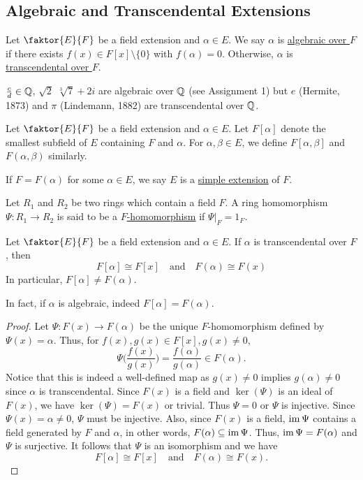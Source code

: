 \documentclass[11pt]{article}
\newcommand{\quotient}[2]{\faktor{#1}{#2}}
\begin{document}
\subsection{Algebraic and Transcendental Extensions}
\begin{definition}
Let $\quotient{E}{F}$ be a field extension and $\alpha \in E$. We say $\alpha$ is
\underline{algebraic over $F$} if there exists $f(x) \in F[x]\setminus \{0\}$
with $f(\alpha) = 0$. Otherwise, $\alpha$ is \underline{transcendental over
$F$}.
\end{definition}
\begin{example}
$\frac{c}{d} \in \mathbb{Q}$, $\sqrt 2$ $\sqrt[3]{7} + 2i$ are algebraic over $\mathbb{Q}$
(see Assignment 1) but $e$ (Hermite, 1873) and $\pi$ (Lindemann, 1882) are
transcendental over $\mathbb{Q}$.
\end{example}
Let $\quotient{E}{F}$ be a field extension and $\alpha \in E$. Let $F[\alpha]$ denote the
smallest subfield of $E$ containing $F$ and $\alpha$. For $\alpha, \beta \in E$,
we define $F[\alpha, \beta]$ and $F(\alpha, \beta)$ similarly.
\begin{definition}
If $F = F(\alpha)$ for some $\alpha \in E$, we say $E$ is a \underline{simple
extension} of $F$.
\end{definition}
\begin{definition}
Let $R_1$ and $R_2$ be two rings which contain a field $F$. A ring homomorphism
$\Psi: R_1 \to R_2$ is said to be a \underline{$F$-homomorphism} if $\Psi|_F =
1_F$.
\end{definition}
\begin{theorem} \label{theorem2}
Let $\quotient{E}{F}$ be a field extension and $\alpha \in E$. If $\alpha$ is transcendental
over $F$, then
\begin{equation*}
F[\alpha] \cong F[x] \quad \text{and} \quad F(\alpha) \cong F(x)
\end{equation*}
In particular, $F[\alpha] \neq F(\alpha)$.
\end{theorem}
\begin{remark}
In fact, if $\alpha$ is algebraic, indeed $F[\alpha] = F(\alpha)$.
\end{remark}
\begin{proof}
Let $\Psi:F(x) \to F(\alpha)$ be the unique $F$-homomorphism defined by $\Psi(x)
= \alpha$. Thus, for $f(x), g(x) \in F[x], g(x) \neq 0$, 
$$\Psi\bigg(\frac{f(x)}{g(x)}\bigg) = \frac{f(\alpha)}{g(\alpha)} \in
F(\alpha).$$ 
Notice that this is indeed a well-defined map as $g(x) \neq 0$ implies
$g(\alpha) \neq 0$ since $\alpha$ is transcendental. Since $F(x)$ is a field and
$\ker(\Psi)$ is an ideal of $F(x)$, we have $\ker(\Psi) = F(x)$ or trivial. Thus
$\Psi = 0$ or $\Psi$ is injective. Since $\Psi(x) = \alpha \neq 0$, $\Psi$ must
be injective. Also, since $F(x)$ is a field, $\operatorname{im}\Psi$ contains a field
generated by $F$ and $\alpha$, in other words, $F(\alpha) \subseteq \operatorname{im}\Psi$.
Thus, $\operatorname{im}\Psi = F(\alpha)$ and $\Psi$ is surjective. It follows that
$\Psi$ is an isomorphism and we have
\begin{equation*}
F[\alpha] \cong F[x] \quad \text{and} \quad F(\alpha) \cong F(x).
\end{equation*}
\end{proof}
\end{document}
